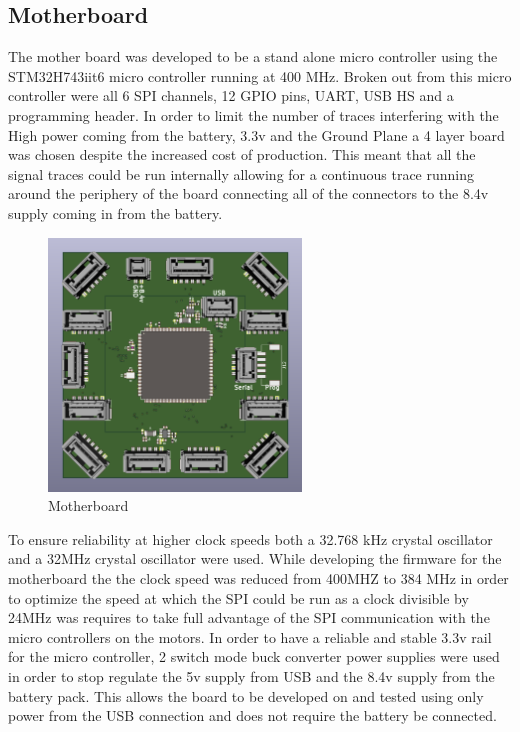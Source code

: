 \subsection{Motherboard}
The mother board was developed to be a stand alone micro controller using the STM32H743iit6 micro controller running at 400 MHz. Broken out from this micro controller were all 6 SPI channels, 12 GPIO pins, UART, USB HS and a programming header. In order to limit the number of traces interfering with the High power  coming from the battery, 3.3v and the Ground Plane a 4 layer board was chosen despite the increased cost of production. This meant that all the signal traces could be run internally allowing for a continuous trace running around the periphery of the board connecting all of the connectors to the 8.4v supply coming in from the battery.
\begin{figure}[H]
       \centering
       \includegraphics[width=0.6\textwidth]{figures/Motherboard.png}
       \caption{Motherboard}
       \label{fig:MotherboardPCB}
   \end{figure}
To ensure reliability at higher clock speeds both a 32.768 kHz crystal oscillator and a 32MHz crystal oscillator were used. While developing the firmware for the motherboard the the clock speed was reduced from 400MHZ to 384 MHz in order to optimize the speed at which the SPI could be run as a clock divisible by 24MHz was requires to take full advantage of the SPI communication with the micro controllers on the motors. In order to have a reliable and stable 3.3v rail for the micro controller, 2 switch mode buck converter power supplies were used in order to stop regulate the 5v supply from USB and the 8.4v supply from the battery pack. This allows the board to be developed on and tested using only power from the USB connection and does not require the battery be connected. 
  
